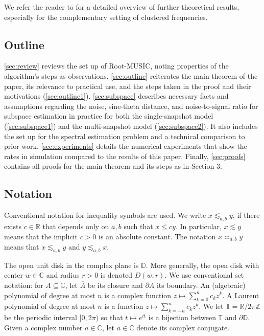\documentclass[11pt]{article}
\theoremstyle{definition}
\numberwithin{theorem}{section}
\numberwithin{equation}{section}
\def\C{\mathbb{C}}
\def\D{\mathbb{D}}
\def\R{\mathbb{R}}
\def\T{\mathbb{T}}
\def\Z{\mathbb{Z}}
\renewcommand{\subset}{\subseteq}
\numberwithin{equation}{section}
\begin{document}
We refer the reader to \cite{li2021stable,batenkov2021super} for a detailed overview of further theoretical results, especially for the complementary setting of clustered frequencies. 


\subsection{Outline}

\cref{sec:review} reviews the set up of Root-MUSIC, noting properties of the algorithm's steps as observations. \cref{sec:outline} reiterates the main theorem of the paper, its relevance to practical use, and the steps taken in the proof and their motivations (\cref{sec:outline1}). \cref{sec:subspace} describes necessary facts and assumptions regarding the noise, sine-theta distance, and noise-to-signal ratio for subspace estimation in practice for both the single-snapshot model (\cref{sec:subspace1}) and the multi-snapshot model (\cref{sec:subspace2}). It also includes the set up for the spectral estimation problem and a technical comparison to prior work. \cref{sec:experiments} details the numerical experiments that show the rates in simulation compared to the results of this paper. Finally, \cref{sec:proofs} contains all proofs for the main theorem and its steps as in Section 3. 

\subsection{Notation}

Conventional notation for inequality symbols are used. We write $x \lesssim_{a,b} y$, if there exists $c\in \R$ that depends only on $a,b$ such that  $x \leq cy$. In particular, $x\lesssim y$ means that the implicit $c>0$ is an absolute constant. The notation $x\asymp_{a,b} y$ means that $x\lesssim_{a,b} y$ and $y\lesssim_{a,b} x$. 


The open unit disk in the complex plane is $\D$. More generally, the open disk with center $w\in\C$ and radius $r>0$ is denoted $D(w,r)$. We use conventional set notation: for $A\subset\C$, let $\overline A$ be its closure and $\partial A$ its boundary. An (algebraic) polynomial of degree at most $n$ is a complex function $z\mapsto \sum_{k=0}^n c_k z^k$. A Laurent polynomial of degree at most $n$ is a function $z\mapsto \sum_{k=-n}^n c_k z^k$. We let $\T=\R/2\pi \Z$ be the periodic interval $[0,2\pi)$ so that $t\mapsto e^{it}$ is a bijection between $\T$ and $\partial\D$. Given a complex number $a \in \C$, let $\overline{a} \in \C$ denote its complex conjugate. 
\end{document}
